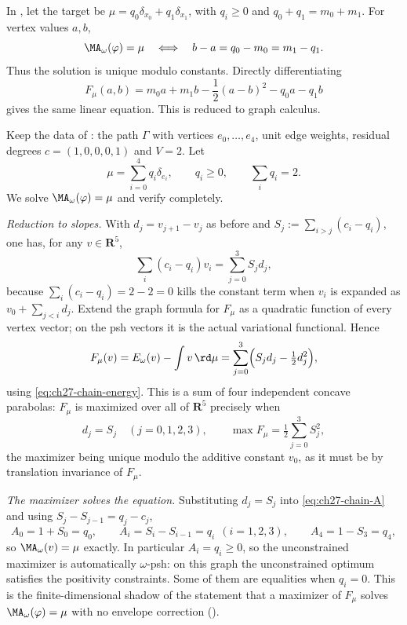 \begin{example}
\label{ex:ch27-two-vertex-euler-lagrange}
In , let the target be
$\mu=q_0\delta_{x_0}+q_1\delta_{x_1}$, with
$q_i\geq0$ and $q_0+q_1=m_0+m_1$. For vertex values $a,b$,
\[
 \MA_\omega(\varphi)=\mu
 \quad\Longleftrightarrow\quad
 b-a=q_0-m_0=m_1-q_1.
\]
Thus the solution is unique modulo constants. Directly differentiating
\[
 F_\mu(a,b)
 =m_0a+m_1b-\frac12(a-b)^2-q_0a-q_1b
\]
gives the same linear equation. This is
 reduced to graph calculus.
\end{example}

\begin{example}
\label{ex:ch27-euler-lagrange-chain}
Keep the data of : the path $\Gamma$ with
vertices $e_0,\dots,e_4$, unit edge weights, residual degrees
$c=(1,0,0,0,1)$ and $V=2$.  Let
\[
 \mu=\sum_{i=0}^4q_i\delta_{e_i},
 \qquad q_i\geq0,\qquad \sum_iq_i=2 .
\]
We solve $\MA_\omega(\varphi)=\mu$ and verify
 completely.

\emph{Reduction to slopes.}  With $d_j=v_{j+1}-v_j$ as before and
$S_j:=\sum_{i>j}(c_i-q_i)$, one has, for any $v\in\mathbf R^5$,
\[
 \sum_i(c_i-q_i)v_i=\sum_{j=0}^3S_jd_j,
\]
because $\sum_i(c_i-q_i)=2-2=0$ kills the constant term when $v_i$ is
expanded as $v_0+\sum_{j<i}d_j$.  Extend the graph formula for $F_\mu$
as a quadratic function of every vertex vector; on the psh vectors it is
the actual variational functional.  Hence
\begin{equation}\label{eq:ch27-chain-variational}
 F_\mu(v)=E_\omega(v)-\int v\,\rd\mu
 =\sum_{j=0}^3\Bigl(S_jd_j-\tfrac12d_j^2\Bigr),
\end{equation}
using \eqref{eq:ch27-chain-energy}.  This is a sum of four independent
concave parabolas: $F_\mu$ is maximized over all of $\mathbf R^5$
precisely when
\[
 d_j=S_j\quad(j=0,1,2,3),
 \qquad
 \max F_\mu=\tfrac12\sum_{j=0}^3S_j^2 ,
\]
the maximizer being unique modulo the additive constant $v_0$, as it must
be by translation invariance of $F_\mu$.

\emph{The maximizer solves the equation.}  Substituting $d_j=S_j$ into
\eqref{eq:ch27-chain-A} and using $S_j-S_{j-1}=q_j-c_j$,
\[
 A_0=1+S_0=q_0,\qquad
 A_i=S_i-S_{i-1}=q_i\ \ (i=1,2,3),\qquad
 A_4=1-S_3=q_4 ,
\]
so $\MA_\omega(v)=\mu$ exactly.  In particular $A_i=q_i\geq0$, so the
unconstrained maximizer is automatically $\omega$-psh: on this graph the
unconstrained optimum satisfies the positivity constraints.  Some of them
are equalities when $q_i=0$.  This is the
finite-dimensional shadow of the statement that a maximizer of $F_\mu$
solves $\MA_\omega(\varphi)=\mu$ with no envelope correction
().


\end{example}
